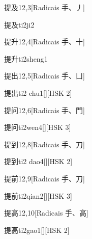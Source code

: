 \begin{entry}{提及}{12,3}[Radicais ⼿、⼃]
  \begin{phonetics}{提及}{ti2ji2}
  \end{phonetics}
\end{entry}

\begin{entry}{提升}{12,4}[Radicais ⼿、⼗]
  \begin{phonetics}{提升}{ti2sheng1}
  \end{phonetics}
\end{entry}

\begin{entry}{提出}{12,5}[Radicais ⼿、⼐]
  \begin{phonetics}{提出}{ti2 chu1}[][HSK 2]
  \end{phonetics}
\end{entry}

\begin{entry}{提问}{12,6}[Radicais ⼿、⾨]
  \begin{phonetics}{提问}{ti2wen4}[][HSK 3]
  \end{phonetics}
\end{entry}

\begin{entry}{提到}{12,8}[Radicais ⼿、⼑]
  \begin{phonetics}{提到}{ti2 dao4}[][HSK 2]
  \end{phonetics}
\end{entry}

\begin{entry}{提前}{12,9}[Radicais ⼿、⼑]
  \begin{phonetics}{提前}{ti2qian2}[][HSK 3]
  \end{phonetics}
\end{entry}

\begin{entry}{提高}{12,10}[Radicais ⼿、⾼]
  \begin{phonetics}{提高}{ti2gao1}[][HSK 2]
  \end{phonetics}
\end{entry}


